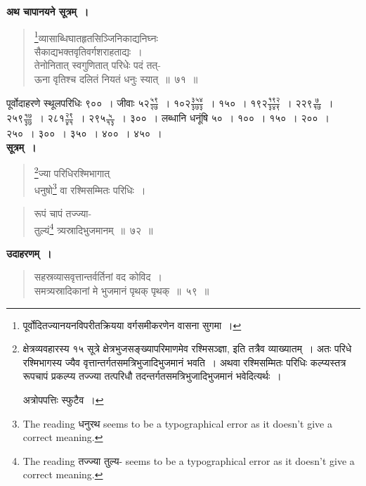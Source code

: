 \documentclass[11pt, openany]{book}
\begin{document}
 \textbf{अथ चापानयने सूत्रम्~।} 
\begin{quote}
    \bs 
    \footnote{पूर्वोदितज्यानयनविपरीतक्रियया वर्गसमीकरणेन वासना
सुगमा~।}व्यासाब्धिघातहृतसिञ्जिनिकाद्यनिघ्नः \\
सैकाद्यभक्तवृतिवर्गशराहताद्यः~।\\
तेनोनितात् स्वगुणितात् परिधेः पदं तत्-\\
ऊना वृतिश्च दलितं नियतं धनुः स्यात्~॥~७१~॥
\end{quote}
 
 पूर्वोदाहरणे स्थूलपरिधिः ९००~। जीवाः $\mbox{५२}\frac{\mbox{५९}}{\mbox{२७}}$~। $\mbox{१०२}\frac{\mbox{३५४}}{\mbox{३७३}}$~।
१५०~। $\mbox{१९२}\frac{\mbox{१९२}}{\mbox{३४९}}$~। $\mbox{२२९}\frac{\mbox{७}}{\mbox{१७}}$~। $\mbox{२५९}\frac{\mbox{१७}}{\mbox{३७}}$~। $\mbox{२८१}\frac{\mbox{२९}}{\mbox{४१}}$~।
$\mbox{२९५}\frac{\mbox{५}}{\mbox{१३}}$~। ३००~। 
लब्धानि धनूंषि ५०~। १००~। १५०~। २००~। २५०~। ३००~। ३५०~। ४००~। ४५०~। \\

\vspace{-2mm}
 \textbf{सूत्रम्~।}

\begin{quote}
    \bs 
\footnote{क्षेत्रव्यवहारस्य १५ सूत्रे क्षेत्रभुजसङ्ख्यापरिमाणमेव रश्मिसञ्ज्ञा, इति तत्रैव व्याख्यातम्~। अतः परिधे रश्मिभागस्य ज्यैव
वृत्तान्तर्गतसमत्रिभुजादिभुजमानं भवति~। अथवा रश्मिसम्मितः
परिधिः कल्प्यस्तत्र रूपचापं प्रकल्प्य तज्ज्या तत्परिधौ तदन्तर्गतसमत्रिभुजादिभुजमानं भवेदित्यर्थः~। 
\vspace{1mm}

\hspace{2mm} अत्रोपपत्तिः स्फुटैव~।}ज्या परिधिरश्मिभागात् \\
 धनुषो\footnote{The reading धनुरथ seems to be a typographical error as it doesn't give a correct meaning.} वा रश्मिसम्मितः परिधिः~।
\end{quote}

\newpage%

\begin{quote}
    \bs 
 रूपं चापं तज्ज्या-\\
 तुल्यं\footnote{The reading तज्ज्या तुल्य- seems to be a typographical error as it doesn't give a correct meaning.} त्र्यस्रादिभुजमानम्~॥~७२~॥
\end{quote}

\textbf{उदाहरणम्~।} 

\begin{quote}
    \bqt 
सहस्रव्यासवृत्तान्तर्वर्तिनां वद कोविद~।\\
समत्र्यस्रादिकानां मे भुजमानं पृथक् पृथक्~॥~५९~॥
\end{quote}
\end{document}
